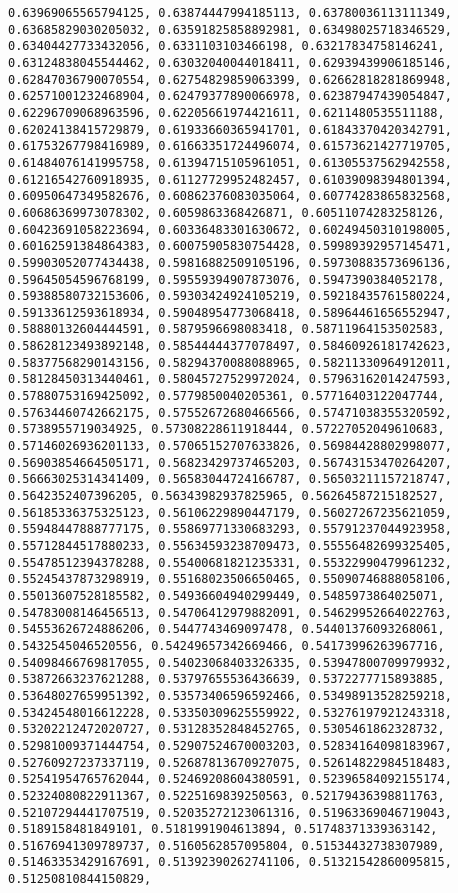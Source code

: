 \documentclass[11pt]{article}
\begin{document}
\begin{Verbatim}[commandchars=\\\{\}]
0.63969065565794125, 0.63874447994185113, 0.63780036113111349, 0.63685829030205032, 0.63591825858892981, 0.63498025718346529, 0.63404427733432056, 0.6331103103466198, 0.63217834758146241, 0.63124838045544462, 0.63032040044018411, 0.62939439906185146, 0.62847036790070554, 0.62754829859063399, 0.62662818281869948, 0.62571001232468904, 0.62479377890066978, 0.62387947439054847, 0.62296709068963596, 0.62205661974421611, 0.6211480535511188, 0.62024138415729879, 0.61933660365941701, 0.61843370420342791, 0.61753267798416989, 0.61663351724496074, 0.61573621427719705, 0.61484076141995758, 0.61394715105961051, 0.61305537562942558, 0.61216542760918935, 0.61127729952482457, 0.61039098394801394, 0.60950647349582676, 0.60862376083035064, 0.60774283865832568, 0.60686369973078302, 0.6059863368426871, 0.60511074283258126, 0.60423691058223694, 0.60336483301630672, 0.60249450310198005, 0.60162591384864383, 0.60075905830754428, 0.59989392957145471, 0.59903052077434438, 0.59816882509105196, 0.59730883573696136, 0.59645054596768199, 0.59559394907873076, 0.5947390384052178, 0.59388580732153606, 0.59303424924105219, 0.59218435761580224, 0.59133612593618934, 0.59048954773068418, 0.58964461656552947, 0.58880132604444591, 0.5879596698083418, 0.58711964153502583, 0.58628123493892148, 0.58544444377078497, 0.58460926181742623, 0.58377568290143156, 0.58294370088088965, 0.58211330964912011, 0.58128450313440461, 0.58045727529972024, 0.57963162014247593, 0.57880753169425092, 0.5779850040205361, 0.57716403122047744, 0.57634460742662175, 0.57552672680466566, 0.57471038355320592, 0.5738955719034925, 0.57308228611918444, 0.57227052049610683, 0.57146026936201133, 0.57065152707633826, 0.56984428802998077, 0.56903854664505171, 0.56823429737465203, 0.56743153470264207, 0.56663025314341409, 0.56583044724166787, 0.56503211157218747, 0.5642352407396205, 0.56343982937825965, 0.56264587215182527, 0.56185336375325123, 0.56106229890447179, 0.56027267235621059, 0.55948447888777175, 0.55869771330683293, 0.55791237044923958, 0.55712844517880233, 0.55634593238709473, 0.55556482699325405, 0.55478512394378288, 0.55400681821235331, 0.55322990479961232, 0.55245437873298919, 0.55168023506650465, 0.55090746888058106, 0.55013607528185582, 0.54936604940299449, 0.5485973864025071, 0.54783008146456513, 0.54706412979882091, 0.54629952664022763, 0.54553626724886206, 0.5447743469097478, 0.54401376093268061, 0.5432545046520556, 0.54249657342669466, 0.54173996263967716, 0.54098466769817055, 0.54023068403326335, 0.53947800709979932, 0.53872663237621288, 0.53797655536436639, 0.5372277715893885, 0.53648027659951392, 0.53573406596592466, 0.53498913528259218, 0.53424548016612228, 0.53350309625559922, 0.53276197921243318, 0.53202212472020727, 0.53128352848452765, 0.5305461862328732, 0.52981009371444754, 0.52907524670003203, 0.52834164098183967, 0.52760927237337119, 0.52687813670927075, 0.52614822984518483, 0.52541954765762044, 0.52469208604380591, 0.52396584092155174, 0.52324080822911367, 0.5225169839250563, 0.52179436398811763, 0.52107294441707519, 0.52035272123061316, 0.51963369046719043, 0.5189158481849101, 0.5181991904613894, 0.51748371339363142, 0.51676941309789737, 0.5160562857095804, 0.51534432738307989, 0.51463353429167691, 0.51392390262741106, 0.51321542860095815, 0.51250810844150829, 
\end{Verbatim}
\end{document}
